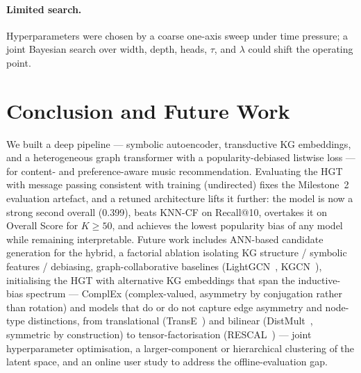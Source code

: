 \documentclass[10pt,twocolumn,letterpaper]{article}
\begin{document}
\paragraph{Limited search.} Hyperparameters were chosen by a coarse one-axis sweep
under time pressure; a joint Bayesian search over width, depth, heads, $\tau$, and
$\lambda$ could shift the operating point.

\section{Conclusion and Future Work}
\label{sec:conclusion}
We built a deep pipeline --- symbolic autoencoder, transductive KG embeddings, and
a heterogeneous graph transformer with a popularity-debiased listwise loss --- for
content- and preference-aware music recommendation. Evaluating the HGT with
message passing consistent with training (undirected) fixes the Milestone~2
evaluation artefact, and a retuned architecture lifts it further: the model is now
a strong second overall (0.399), beats KNN-CF on Recall@10,
overtakes it on Overall Score for $K\!\geq\!50$, and achieves the lowest popularity
bias of any model while remaining interpretable. Future work includes ANN-based
candidate generation for the hybrid, a factorial ablation isolating KG structure /
symbolic features / debiasing, graph-collaborative baselines
(LightGCN~\cite{he2020lightgcn}, KGCN~\cite{wang2019kgcn}), initialising the HGT
with alternative KG embeddings that span the inductive-bias spectrum --- ComplEx
(complex-valued, asymmetry by conjugation rather than rotation) and models that do
or do not capture edge asymmetry and node-type distinctions, from translational
(TransE~\cite{bordes2013transe}) and bilinear (DistMult~\cite{yang2015distmult},
symmetric by construction) to tensor-factorisation
(RESCAL~\cite{nickel2011rescal}) --- joint hyperparameter optimisation, a larger-component or hierarchical
clustering of the latent space, and an online user study to address the
offline-evaluation gap.

\end{document}
